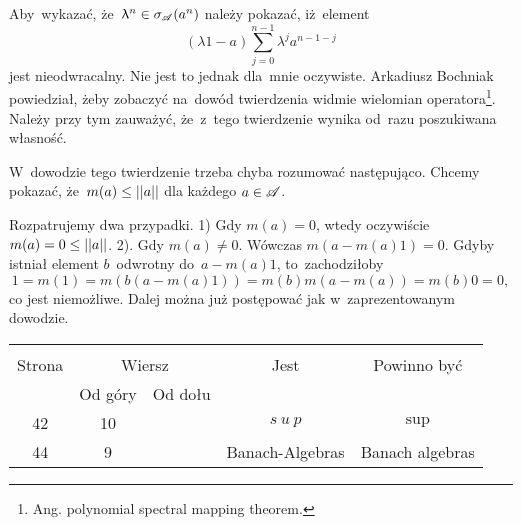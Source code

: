 \documentclass[a4paper,11pt]{article}
\begin{document}
\start {} 
Aby~wykazać, że~$\uplambda^{ n } \in \sigma_{ \mathcal{ A } }( a^{ n })$
należy pokazać, iż~element
\begin{equation}
  \label{eq:DE-1}
  ( \lambda 1 - a ) \sum_{ j = 0 }^{ n - 1 } \lambda^{ j } a^{ n - 1 - j }
\end{equation}
jest nieodwracalny. Nie jest to jednak dla~mnie oczywiste. Arkadiusz
Bochniak powiedział, żeby zobaczyć na~dowód twierdzenia widmie
wielomian operatora\footnote{Ang. polynomial spectral mapping
  theorem.}. Należy przy tym zauważyć, że~z~tego twierdzenie wynika
od~razu poszukiwana własność.

\vspace{\spaceFour}


\start {}  W~dowodzie tego twierdzenie trzeba
chyba rozumować następująco. Chcemy pokazać,
że~$m( a ) \leq \left|\left|  a  \right|\right|$ dla każdego $a \in \mathcal{A}$.

Rozpatrujemy dwa przypadki. 1) Gdy $m( a ) = 0$, wtedy oczywiście
$m( a ) = 0 \leq \left|\left|  a  \right|\right|$. 2). Gdy $m( a ) \neq 0$. Wówczas
$m( a - m( a ) 1 ) = 0$. Gdyby istniał element $b$~odwrotny
do~$a - m( a ) 1$, to~zachodziłoby
\begin{equation}
  1 = m( 1 ) = m( b ( a - m( a ) 1 ) ) = m( b ) m( a - m( a ) )
  = m( b ) 0 = 0,
\end{equation}
co jest niemożliwe. Dalej można już postępować jak w~zaprezentowanym
dowodzie.


\begin{center}
  \begin{tabular}{|c|c|c|c|c|}
    \hline
    & \multicolumn{2}{c|}{} & & \\
    Strona & \multicolumn{2}{c|}{Wiersz} & Jest
                              & Powinno być \\ \cline{2-3}
    & Od góry & Od dołu & & \\
    \hline
    42  & 10 & & $s\: u\: p$ & $\sup$ \\
    44  &  9 & & Banach-Algebras & Banach algebras \\
    \hline
  \end{tabular}
\end{center}

\vspace{\spaceTwo}
\end{document}
